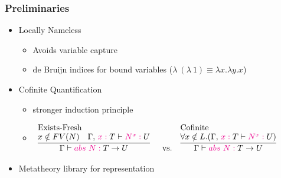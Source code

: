 \documentclass{beamer}
\let\oldframetitle\frametitle
\renewcommand{\frametitle}[1]{
  \oldframetitle{#1}\vspace{-3.5cm}
}
\begin{document}
\begin{frame}
\oldframetitle{Preliminaries}
\begin{itemize}
\item Locally Nameless
  \begin{itemize}
  \item Avoids variable capture
  \item de Bruijn indices for bound variables
    ($\lambda~(\lambda~1) \equiv \lambda x. \lambda y. x$)
  \end{itemize}
\item Cofinite Quantification
  \begin{itemize}
  \item stronger induction principle
  \item
    \begin{math}
    \begin{array}{lcl}
      \mbox{Exists-Fresh} & & \mbox{Cofinite}\\
      \inference{
        x \notin FV(N) &
        \Tp{\Gamma \comma \Tmof{x}T} \Tpvdash \Tmof{N^x}\Tp{U}
      }{}{
        \Tp{\Gamma} \Tpvdash \Tmof{abs~N}\Tp{T \to U}
      }
    & \mbox{vs}. &
      \inference{
        \forall x \notin L.
        (\Tp{\Gamma \comma \Tmof{x}T} \Tpvdash \Tmof{N^x}\Tp{U})
      }{}{
        \Tp{\Gamma} \Tpvdash \Tmof{abs~N}\Tp{T \to U}
      }
    \end{array}
    \end{math}
  \end{itemize}
\item Metatheory library for representation
\end{itemize}
\end{frame}

\begin{comment}
one of the key issues when formalising programming language metatheory is how
to represent variables both bound and free. I chose the locally nameless
representation which separates bound and free variables into distinct
entities. Thus it avoids the variable capture problem in contrast to other
approaches.

In this approach, a de Bruijn index is a number used to represent a bound
variable which indicates the position of its binder (starting from zero for
the innermost binder).

Constructs with binders have to open the term with a free variable and this
requires some technique for handling freshness of the opening variable. I
chose to adopt the cofinite quantification approach which allows to exclude a
finite set of names from consideration. in contrast to the sometimes weaker
notion of a single sufficiently fresh name
\end{comment}
\end{document}
